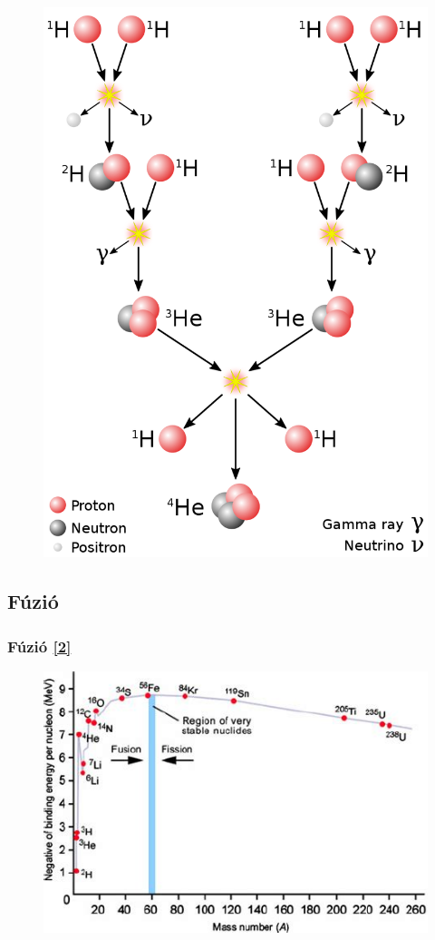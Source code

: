 \documentclass{beamer}
\begin{document}
\begin{frame}
\begin{figure}
        \includegraphics[scale=0.13]{800px-Fusion_in_the_Sun.svg.png}
    \end{figure} 
\end{frame}


\subsection{Fúzió}
\begin{frame}
    \frametitle{Fúzió \hyperlink{2}{\small[2]}}
    \begin{figure}
        \includegraphics[scale=0.6]{fusion_fission.jpeg}
    \end{figure} 
\end{frame}
\end{document}
